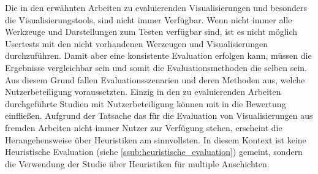 \documentclass[draft=false
              ,paper=a4
              ,twoside=false
              ,fontsize=11pt
              ,headsepline
              ,BCOR10mm
              ,DIV11
              ]{scrbook}
\begin{document}
Die in den erwähnten Arbeiten zu evaluierenden Visualisierungen und besonders die Visualisierungstools, sind nicht immer Verfügbar. Wenn nicht immer alle Werkzeuge und Darstellungen zum Testen verfügbar sind, ist es nicht möglich Usertests mit den nicht vorhandenen Werzeugen und Visualisierungen durchzuführen. Damit aber eine konsistente Evaluation erfolgen kann, müssen die Ergebnisse vergleichbar sein und somit die Evaluationsmethoden die selben sein. Aus diesem Grund fallen Evaluationsszenarien und deren Methoden aus, welche Nutzerbeteiligung voraussetzten. Einzig in den zu evaluierenden Arbeiten durchgeführte Studien mit Nutzerbeteiligung können mit in die Bewertung einfließen. Aufgrund der Tatsache das für die Evaluation von Visualisierungen aus fremden Arbeiten nicht immer Nutzer zur Verfügung stehen, erscheint die Herangehensweise über Heuristiken am sinnvollsten. In diesem Kontext ist keine Heuristische Evaluation (siehe \ref{ssub:heuristische_evaluation}) gemeint, sondern die Verwendung der Studie über Heuristiken für multiple Anschichten.
\end{document}
